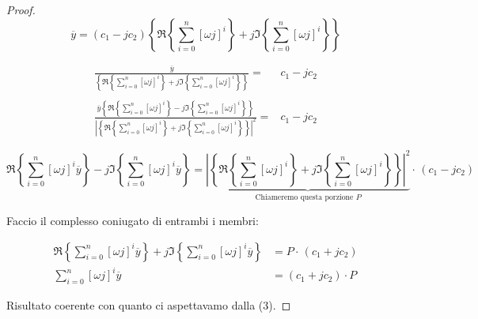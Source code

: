 \documentclass[11pt,italian]{article}
\theoremstyle{remark}
\begin{document}
\begin{proof}
    \[
        \overline{y} = (c_1 - j c_2) \left\{ \Re \left\{\sum_{i=0}^n \left[ \omega j \right]^i \right\} + j \Im \left\{ \sum_{i=0}^n \left[ \omega j \right]^i \right\} \right\}
    \]

    \vspace{1em}

    \begin{align*}
        \frac
        {\overline{y}}
        {\left\{ \Re \left\{\sum_{i=0}^n \left[ \omega j \right]^i \right\} + j \Im \left\{ \sum_{i=0}^n \left[ \omega j \right]^i \right\} \right\}} =
         & c_1 - j c_2 \\
        \\
        \frac
        {\overline{y} {\left\{ \Re \left\{\sum_{i=0}^n \left[ \omega j \right]^i \right\} - j \Im \left\{ \sum_{i=0}^n \left[ \omega j \right]^i \right\} \right\}}}
        {\left|\left\{ \Re \left\{\sum_{i=0}^n \left[ \omega j \right]^i \right\} + j \Im \left\{ \sum_{i=0}^n \left[ \omega j \right]^i \right\} \right\} \right|^2} =
         & c_1 - j c_2
    \end{align*}

    \begin{equation*}
        \Re \left\{\sum_{i=0}^n \left[ \omega j \right]^i \overline{y} \right\} - j \Im \left\{ \sum_{i=0}^n \left[ \omega j \right]^i \overline{y} \right\} =
        \underbrace{\left|\left\{ \Re \left\{\sum_{i=0}^n \left[ \omega j \right]^i \right\} + j \Im \left\{ \sum_{i=0}^n \left[ \omega j \right]^i \right\} \right\} \right|^2}_{\mbox{Chiameremo questa porzione }P} \cdot\, (c_1 - j c_2)
    \end{equation*}

    Faccio il complesso coniugato di entrambi i membri:

    \begin{align*}
        \Re \left\{\sum_{i=0}^n \left[ \omega j \right]^i \overline{y} \right\} + j \Im \left\{ \sum_{i=0}^n \left[ \omega j \right]^i \overline{y} \right\} & =
        P \cdot\, (c_1 + j c_2)                                                                                                                                                        \\
        \sum_{i=0}^n \left[ \omega j \right]^i \overline{y}                                                                                                  & = (c_1 + j c_2) \cdot P
    \end{align*}

    Risultato coerente con quanto ci aspettavamo dalla (3).
\end{proof}
\end{document}
